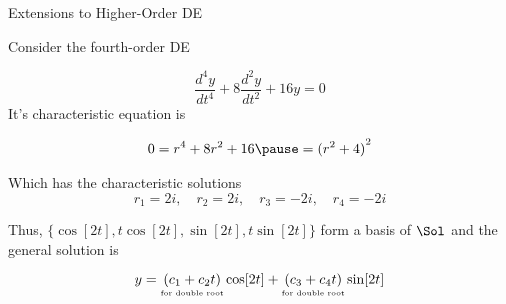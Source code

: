 \documentclass{beamer}
\begin{document}
\begin{frame}{Extensions to Higher-Order DE}
\begin{example}
Consider the fourth-order DE

\vspace{-1mm}
\begin{equation*}
\dfrac{d^4y}{dt^4}
+8\dfrac{d^2y}{dt^2}
+16y
=0
\end{equation*}\pause
It's characteristic equation is

\vspace{-1mm}
\begin{equation*}
\begin{aligned}
0=r^4+8r^2+16\pause
={(r^2+4)}^2
\end{aligned}
\end{equation*}\pause

\vspace{-3mm}
Which has the characteristic solutions
\begin{equation*}
r_1=2i,\quad
r_2=2i,\quad
r_3=-2i,\quad
r_4=-2i
\end{equation*}\pause

\vspace{-3mm}
Thus, $\{\cos[2t],t\cos[2t],\sin[2t],t\sin[2t]\}$ form a basis of $\Sol$ and the general solution is

\vspace{-4mm}
\begin{equation*}
y=\underset{\text{\tiny for double root}}{(c_1+c_2t)}\cos[2t]
 +\underset{\text{\tiny for double root}}{(c_3+c_4t)}\sin[2t]
\end{equation*}
\end{example}
\end{frame}
\end{document}
